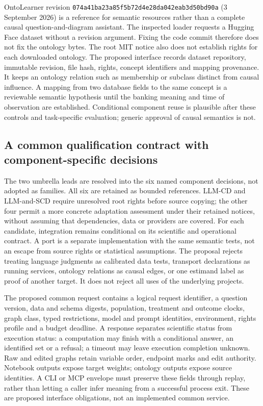 OntoLearner revision
\texttt{074a41ba23a85f5b72d4}\allowbreak\texttt{e28da042eab3d50bd90a}
(3 September 2026) is a reference for semantic resources rather than a complete
causal question-and-diagram assistant. The inspected loader requests a
Hugging Face dataset without a revision argument. Fixing the code commit
therefore does not fix the ontology bytes. The root MIT notice also does not
establish rights for each downloaded ontology. The proposed interface records
dataset repository, immutable revision, file hash, rights, concept identifiers
and mapping provenance. It keeps an ontology relation such as membership or
subclass distinct from causal influence. A mapping from two database fields
to the same concept is a reviewable semantic hypothesis until the banking
meaning and time of observation are established. Conditional component reuse
is plausible after these controls and task-specific evaluation; generic
approval of causal semantics is not.~\citep{exec13_data_ontolearner_code,exec25_agents_choice}

\subsection{A common qualification contract with component-specific decisions}
The two umbrella leads are resolved into the six named component decisions,
not adopted as families. All six are retained as bounded references. LLM-CD
and LLM-and-SCD require unresolved root rights before source copying; the
other four permit a more concrete adaptation assessment under their retained
notices, without assuming that dependencies, data or providers are covered.
For each candidate, integration remains conditional on its scientific and
operational contract. A port is a separate implementation with the same
semantic tests, not an escape from source rights or statistical assumptions.
The proposal rejects treating language judgments as calibrated data tests,
transport declarations as running services, ontology relations as causal
edges, or one estimand label as proof of another target. It does not reject
all uses of the underlying projects.~\citep{exec25_agents_choice}

The proposed common request contains a logical request identifier, a question
version, data and schema digests, population, treatment and outcome clocks,
graph class, typed restrictions, model and prompt identities, environment,
rights profile and a budget deadline. A response separates scientific status
from execution status: a computation may finish with a conditional answer,
an identified set or a refusal; a timeout may leave execution completion
unknown. Raw and edited graphs retain variable order, endpoint marks and edit
authority. Notebook outputs expose target weights; ontology outputs expose
source identities. A CLI or MCP envelope must preserve these fields through
replay, rather than letting a caller infer meaning from a successful process
exit. These are proposed interface obligations, not an implemented common
service.~\citep{exec25_agents_choice}

